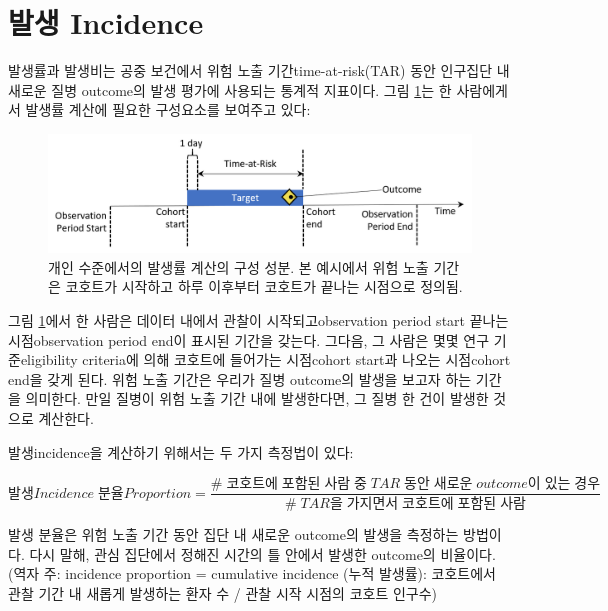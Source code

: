 \documentclass[10.5pt]{book}
\theoremstyle{definition}
\theoremstyle{definition}
\theoremstyle{definition}
\theoremstyle{remark}
\begin{document}
\section{발생 Incidence}\label{-incidence}

발생률과 발생비는 공중 보건에서 위험 노출 기간time-at-risk(TAR) 동안
인구집단 내 새로운 질병 outcome의 발생 평가에 사용되는 통계적 지표이다.
그림 \ref{fig:incidenceTimeline}는 한 사람에게서 발생률 계산에 필요한
구성요소를 보여주고 있다: 

\begin{figure}

{\centering \includegraphics[width=1\linewidth]{images/Characterization/incidenceTimeline} 

}

\caption{개인 수준에서의 발생률 계산의 구성 성분. 본 예시에서 위험 노출 기간은 코호트가 시작하고 하루 이후부터 코호트가 끝나는 시점으로 정의됨.}\label{fig:incidenceTimeline}
\end{figure}

그림 \ref{fig:incidenceTimeline}에서 한 사람은 데이터 내에서 관찰이
시작되고observation period start 끝나는 시점observation period end이
표시된 기간을 갖는다. 그다음, 그 사람은 몇몇 연구 기준eligibility
criteria에 의해 코호트에 들어가는 시점cohort start과 나오는 시점cohort
end을 갖게 된다. 위험 노출 기간은 우리가 질병 outcome의 발생을 보고자
하는 기간을 의미한다. 만일 질병이 위험 노출 기간 내에 발생한다면, 그
질병 한 건이 발생한 것으로 계산한다.

발생incidence을 계산하기 위해서는 두 가지 측정법이 있다:

\[ 
발생 Incidence\;분율 Proportion= \frac{\#\;코호트에\;포함된\;사람\;중\;TAR\;동안\;새로운\;outcome이\;있는\;경우}{\#\;TAR을\;가지면서\;코호트에\;포함된\;사람}
\]

발생 분율은 위험 노출 기간 동안 집단 내 새로운 outcome의 발생을 측정하는
방법이다. 다시 말해, 관심 집단에서 정해진 시간의 틀 안에서 발생한
outcome의 비율이다.  (역자 주: incidence
proportion = cumulative incidence (누적 발생률): 코호트에서 관찰 기간 내
새롭게 발생하는 환자 수 / 관찰 시작 시점의 코호트 인구수)
\end{document}
